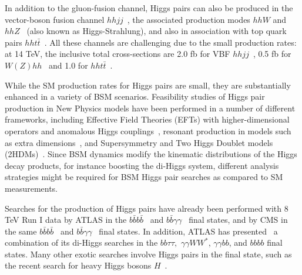 In addition to the gluon-fusion channel, Higgs pairs
can also be produced in the vector-boson fusion
channel $hhjj$~\cite{Contino:2010mh,Dolan:2013rja,Dolan:2015zja,
  Brooijmans:2014eja},
the associated production modes
$hhW$ and $hhZ$~\cite{Barger:1988jk,baglio,Cao:2015oxx}
(also known as Higgs-Strahlung),
and also in association
with top quark pairs $hht\bar{t}$~\cite{Englert:2014uqa}.
%
All these channels are challenging due to the small production
rates: at 14 TeV, the inclusive total cross-sections are
2.0 fb for VBF $hhjj$~\cite{Liu-Sheng:2014gxa},
0.5 fb for $W(Z)hh$~\cite{baglio}
and 1.0 for $hht\bar{t}$~\cite{Englert:2014uqa}.
%



While the SM production rates for Higgs
pairs are small, they are substantially
enhanced in a variety of BSM scenarios.
%
Feasibility studies of Higgs pair production in New Physics
models have been performed in a number of different frameworks,
including Effective Field
Theories (EFTs) with higher-dimensional
operators and anomalous 
Higgs couplings~\cite{Nishiwaki:2013cma,Dall'Osso:2015aia,Azatov:2015oxa,Liu:2014rba,Goertz:2014qta,He:2015spf,Grober:2015cwa,Cao:2015oaa}, resonant production
in models such as extra dimensions~\cite{Gouzevitch:2013qca,Cooper:2013kia,No:2013wsa,Wen-Juan:2015gqg}, and Supersymmetry and
Two Higgs Doublet models (2HDMs)~\cite{Belyaev:1999kk,Han:2013sga,Hespel:2014sla,Wu:2015nba,Cao:2014kya,Ellwanger:2013ova,Cao:2013si}.
%
Since BSM dynamics modify
the kinematic distributions of the Higgs decay products, for
instance boosting the di-Higgs system,
different analysis strategies  might be required for BSM
Higgs pair searches as compared to SM measurements.


Searches for the production of Higgs pairs
have already been performed with 8 TeV Run I data
by ATLAS in the $b\bar{b}b\bar{b}$~\cite{Aad:2015uka}
and $b\bar{b}\gamma\gamma$~\cite{Aad:2014yja} final states,
and by
CMS in the same $b\bar{b}b\bar{b}$~\cite{Khachatryan:2015yea}
and $b\bar{b}\gamma\gamma$~\cite{Chatrchyan:2011wt} final
states.
%
%
In addition, ATLAS has presented~\cite{Aad:2015xja} a combination
of its di-Higgs searches in the $bb\tau\tau,$
$\gamma\gamma WW^*$, $\gamma\gamma bb$, and $bbbb$ final states.
%
Many other exotic searches involve Higgs pairs in the final
state, such as the recent
search for heavy Higgs bosons $H$~\cite{Khachatryan:2015tha}.



